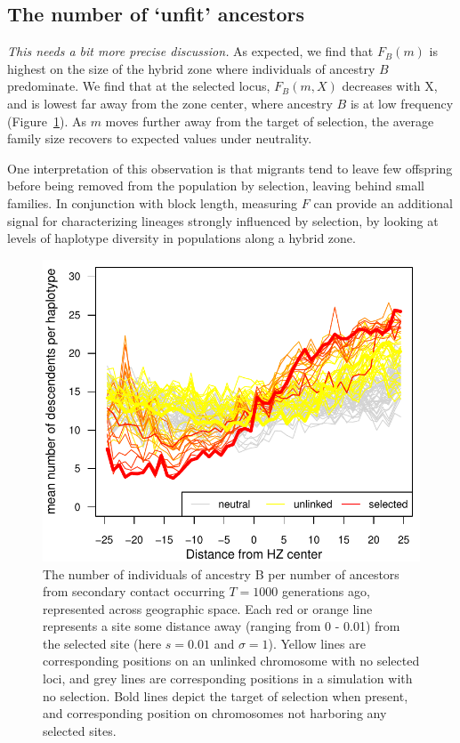 \documentclass[11pt,letterpaper]{article}
\newcommand{\plr}[1]{{\em \color{blue} #1}}
\begin{document}
\subsection*{The number of `unfit' ancestors}

\plr{This needs a bit more precise discussion.}
As expected, we find that $F_B(m)$ is highest on the size of the hybrid zone where individuals of ancestry $B$ predominate. We find that at the selected locus, $F_B(m,X)$ decreases with X, and is lowest far away from the zone center, where ancestry $B$ is at low frequency  (Figure~\ref{Fig:family_size}). As $m$ moves further away from the target of selection, the average family size recovers to expected values under neutrality.

One interpretation of this observation is that migrants tend to leave few offspring before being removed from the population by selection, leaving behind small families. In conjunction with block length, measuring $F$ can provide an additional signal for characterizing lineages strongly influenced by selection, by looking at levels of haplotype diversity in populations along a hybrid zone.

\begin{figure}
\includegraphics{figs/number_of_ancestors_tau1000}
\caption{The number of individuals of ancestry B per number of ancestors from secondary contact occurring $T=1000$ generations ago, represented across geographic space. Each red or orange line represents a site some distance away (ranging from 0 - 0.01) from the selected site (here $s=0.01$ and $\sigma=1$). Yellow lines are corresponding positions on an unlinked chromosome with no selected loci, and grey lines are corresponding positions in a simulation with no selection.  Bold lines depict the target of selection when present, and corresponding position on chromosomes not harboring any selected sites.}\label{Fig:family_size}
\end{figure}
\end{document}
